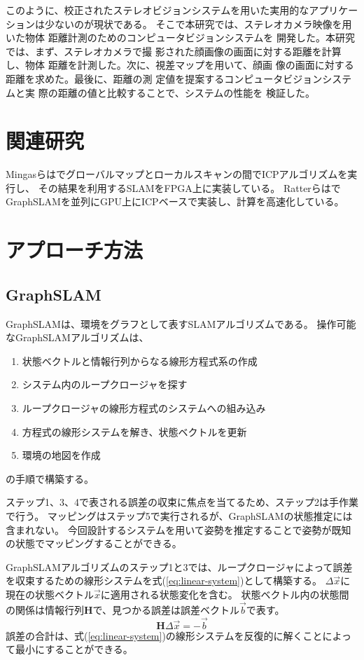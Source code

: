 \documentclass{jsarticle}
\begin{document}
このように、校正されたステレオビジョンシステムを用いた実用的なアプリケーションは少ないのが現状である。
そこで本研究では、ステレオカメラ映像を用いた物体
距離計測のためのコンピュータビジョンシステムを
開発した。本研究では、まず、ステレオカメラで撮
影された顔画像の画面に対する距離を計算し、物体
距離を計測した。次に、視差マップを用いて、顔画
像の画面に対する距離を求めた。最後に、距離の測
定値を提案するコンピュータビジョンシステムと実
際の距離の値と比較することで、システムの性能を
検証した。

\section{関連研究}
Mingasらは\cite{Mingas2012}でグローバルマップとローカルスキャンの間でICPアルゴリズムを実行し、
その結果を利用するSLAMをFPGA上に実装している。
Ratterらは\cite{Ratter2013}でGraphSLAMを並列にGPU上にICPベースで実装し、計算を高速化している。

\section{アプローチ方法}\label{sec:approach}
\subsection{GraphSLAM}
GraphSLAMは、環境をグラフとして表すSLAMアルゴリズムである。
操作可能なGraphSLAMアルゴリズムは、
\begin{enumerate}
    \item 状態ベクトルと情報行列からなる線形方程式系の作成
    \item システム内のループクロージャを探す
    \item ループクロージャの線形方程式のシステムへの組み込み
    \item 方程式の線形システムを解き、状態ベクトルを更新
    \item 環境の地図を作成
\end{enumerate}
の手順で構築する。

ステップ1、3、4で表される誤差の収束に焦点を当てるため、ステップ2は手作業で行う。
マッピングはステップ5で実行されるが、GraphSLAMの状態推定には含まれない。
今回設計するシステムを用いて姿勢を推定することで姿勢が既知の状態でマッピングすることができる。

GraphSLAMアルゴリズムのステップ1と3では、ループクロージャによって誤差を収束するための線形システムを式(\ref{eq:linear-system})として構築する。
$\Delta\vec{x}$に現在の状態ベクトル$\vec{x}$に適用される状態変化を含む。
状態ベクトル内の状態間の関係は情報行列$\mathbf{H}$で、見つかる誤差は誤差ベクトル$\vec{b}$で表す。
\begin{equation}
    \mathbf{H}\Delta\vec{x}=-\vec{b} \label{eq:linear-system}
\end{equation}
誤差の合計は、式(\ref{eq:linear-system})の線形システムを反復的に解くことによって最小にすることができる。
\end{document}
